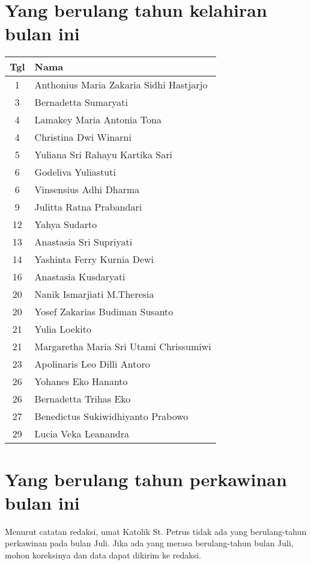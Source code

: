 

\section*{Yang berulang tahun kelahiran bulan ini}


\begin{longtable}{|c|l|} 
\hline
 Tgl & Nama \\ \hline
\endhead
1 & Anthonius Maria Zakaria Sidhi Hastjarjo \\ 
3 & Bernadetta Sumaryati \\ 
4 & Lamakey Maria Antonia Tona \\  
4 & Christina Dwi Winarni \\  
5 & Yuliana Sri Rahayu Kartika Sari \\  
6 & Godeliva Yuliastuti \\  
6 & Vinsensius Adhi Dharma \\  
9 & Julitta Ratna Prabandari \\  
12 & Yahya Sudarto \\  
13 & Anastasia Sri Supriyati \\  
14 & Yashinta Ferry Kurnia Dewi \\  
16 & Anastasia Kusdaryati \\  
20 & Nanik Ismarjiati M.Theresia \\  
20 & Yosef Zakarias Budiman Susanto \\  
21 & Yulia Loekito \\  
21 & Margaretha Maria Sri Utami Chrissumiwi \\  
23 & Apolinaris Leo Dilli Antoro \\  
26 & Yohanes Eko Hananto \\  
26 & Bernadetta Trihas Eko \\  
27 & Benedictus Sukiwidhiyanto Prabowo \\  
29 & Lucia Veka Leanandra \\  \hline
\end{longtable}
 
\section*{Yang berulang tahun perkawinan  bulan ini}

Menurut catatan redaksi, umat Katolik St. Petrus tidak ada yang berulang-tahun perkawinan pada bulan Juli. Jika ada yang merasa berulang-tahun bulan Juli, mohon koreksinya dan data dapat dikirim ke redaksi.
